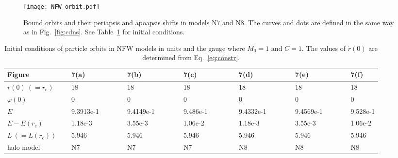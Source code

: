 \documentclass[aps,11pt,nofootinbib,preprintnumbers,groupedaddress,superscriptaddress]{revtex4-2}
\begin{document}
\begin{figure}[t]
\centering
\texttt{[image: NFW\_orbit.pdf]}
\caption{
Bound orbits and their periapsis and apoapsis shifts in models N7 and N8.
The curves and dots are defined 
in the same way
as in Fig.~\ref{fig:cdns}.
See Table~\ref{table:NFWini} for initial conditions. 
}
\label{fig:NFWorbit}
\end{figure}
%
\begin{table}
\begin{tabular}{lllllll}
\hline\hline
Figure~~~~~~~~~
&7(a)~~~~~~~~~
&7(b)~~~~~~~~~
&7(c)~~~~~~~~~
&7(d)~~~~~~~~~
&7(e)~~~~~~~~~
&7(f)
\\
\hline
$r(0) \:\!(=r_{\mathrm{c}})$&18&18&18&18&18&18
\\
$\varphi(0)$&0&0&0&0&0&0
\\
$E$&9.3913e-1&9.4149e-1&9.486e-1&9.4332e-1&9.4569e-1&9.528e-1
\\
$E-E(r_{\mathrm{c}})$&1.18e-3&3.55e-3&1.06e-2&1.18e-3&3.55e-3&1.06e-2
\\
$L \:\!(=L(r_{\mathrm{c}}))$&5.946&5.946&5.946&5.946&5.946&5.946
\\
halo model&N7&N7&N7&N8&N8&N8
\\
\hline\hline
\end{tabular}
\caption{Initial conditions of particle orbits in NFW models in units and the gauge where $M_0=1$ and $C=1$. 
The values of $\dot{r}(0)$ are determined from Eq.~\eqref{eq:constr}.}
\label{table:NFWini}
\end{table}


\end{document}
